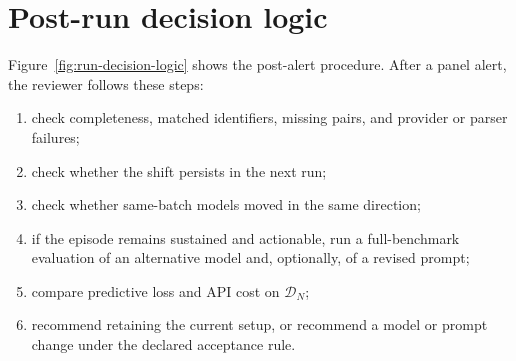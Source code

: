 \section{Post-run decision logic}
\label{sec:decision-logic}
Figure~\ref{fig:run-decision-logic} shows the post-alert procedure.
After a panel alert, the reviewer follows these steps:
\begin{enumerate}
    \item check completeness, matched identifiers, missing pairs, and provider or parser failures;
    \item check whether the shift persists in the next run;
    \item check whether same-batch models moved in the same direction;
    \item if the episode remains sustained and actionable, run a full-benchmark evaluation of an
    alternative model and, optionally, of a revised prompt;
    \item compare predictive loss and API cost on \(\mathcal{D}_N\);
    \item recommend retaining the current setup, or recommend a model or prompt change under the
    declared acceptance rule.
\end{enumerate}

